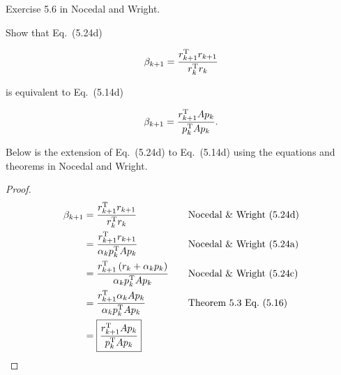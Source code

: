 \begin{problem}
  Exercise 5.6 in Nocedal and Wright.

  Show that Eq.~(5.24d) 
  
  \[ \beta_{k+1} = \frac{r_{k+1}^{\textnormal{T}} r_{k+1}}{r_{k}^{\textnormal{T}} r_{k}} \]

  is equivalent to Eq.~(5.14d)

  \[ \beta_{k+1} = \frac{r_{k+1}^{\textnormal{T}} Ap_{k}}{p_{k}^{\textnormal{T}} Ap_{k}} \text{.}\]
\end{problem}


\noindent
Below is the extension of Eq.~(5.24d) to Eq.~(5.14d) using the equations and theorems in Nocedal and Wright.

\begin{proof}
  \begin{alignat*}{2}
    \beta_{k+1} &= \frac{r_{k+1}^{\textnormal{T}} r_{k+1}}{r_{k}^{\textnormal{T}} r_{k}} &\quad &\text{Nocedal \& Wright~(5.24d)} \\
    &= \frac{r_{k+1}^{\textnormal{T}} r_{k+1}}{\alpha_{k}p^{\textnormal{T}}_{k}Ap_{k}} &\quad &\text{Nocedal \& Wright~(5.24a)} \\
    &= \frac{r_{k+1}^{\textnormal{T}} \left(r_{k} + \alpha_{k}p_{k}\right)}{\alpha_{k}p^{\textnormal{T}}_{k}Ap_{k}} &\quad &\text{Nocedal \& Wright~(5.24c)} \\
    &= \frac{r_{k+1}^{\textnormal{T}} \alpha_{k}Ap_{k}}{\alpha_{k}p^{\textnormal{T}}_{k}Ap_{k}} &\quad &\text{Theorem~5.3 Eq.~(5.16)} \\
    &=\boxed{\frac{r^{\textnormal{T}}_{k+1}Ap_{k}}{p^{\textnormal{T}}_{k}Ap_{k}}} &\quad &\text{}
  \end{alignat*}
\end{proof}
%
%
%
%
